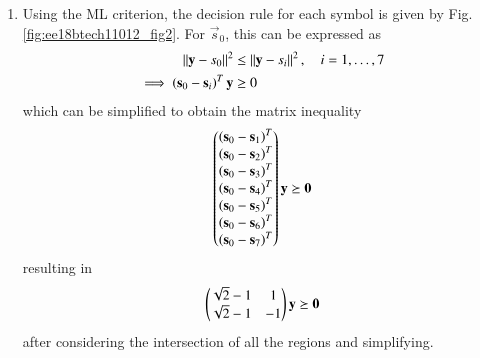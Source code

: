 \begin{enumerate}[label=\thesubsection.\arabic*.,ref=\thesubsection.\theenumi]
\item Using the ML criterion, the decision rule for each symbol is given by Fig. \ref{fig:ee18btech11012_fig2}.  For $\vec{s}_0$, this can be expressed as
\begin{align}
    \left\lVert\textbf{y}-\textbf{$s_{0}$}\right\rVert^2 & \le \left\lVert\textbf{y}-\textbf{$s_{i}$}\right\rVert^2, \quad i = 1,\dots,7\\
\implies \left(\mathbf{s}_0 - \mathbf{s}_i\right)^T \mathbf{y} &\ge 0\\
\end{align}
%
which can be simplified to obtain the matrix inequality
\begin{align}
\begin{pmatrix}
\left(\mathbf{s}_0 - \mathbf{s}_1\right)^T \\
\left(\mathbf{s}_0 - \mathbf{s}_2\right)^T\\
\left(\mathbf{s}_0 - \mathbf{s}_3\right)^T\\
\left(\mathbf{s}_0 - \mathbf{s}_4\right)^T\\
\left(\mathbf{s}_0 - \mathbf{s}_5\right)^T\\
\left(\mathbf{s}_0 - \mathbf{s}_6\right)^T\\
\left(\mathbf{s}_0 - \mathbf{s}_7\right)^T
\end{pmatrix}\mathbf{y} \succeq \mathbf{0} 
\end{align}
%
resulting in 
\begin{align}
\begin{pmatrix}\sqrt{2} - 1 & 1 \\ \sqrt{2} - 1 & -1\end{pmatrix} \mathbf{y} \succeq \mathbf{0}
\end{align}
%
after considering the intersection of all the regions and simplifying.
%
\begin{figure}[!ht]


\end{figure}
\end{enumerate}
